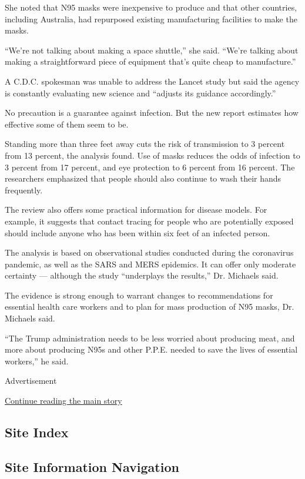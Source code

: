 She noted that N95 masks were inexpensive to produce and that other
countries, including Australia, had repurposed existing manufacturing
facilities to make the masks.

``We're not talking about making a space shuttle,'' she said. ``We're
talking about making a straightforward piece of equipment that's quite
cheap to manufacture.''

A C.D.C. spokesman was unable to address the Lancet study but said the
agency is constantly evaluating new science and ``adjusts its guidance
accordingly.''

No precaution is a guarantee against infection. But the new report
estimates how effective some of them seem to be.

Standing more than three feet away cuts the risk of transmission to 3
percent from 13 percent, the analysis found. Use of masks reduces the
odds of infection to 3 percent from 17 percent, and eye protection to 6
percent from 16 percent. The researchers emphasized that people should
also continue to wash their hands frequently.

The review also offers some practical information for disease models.
For example, it suggests that contact tracing for people who are
potentially exposed should include anyone who has been within six feet
of an infected person.

The analysis is based on observational studies conducted during the
coronavirus pandemic, as well as the SARS and MERS epidemics. It can
offer only moderate certainty --- although the study ``underplays the
results,'' Dr. Michaels said.

The evidence is strong enough to warrant changes to recommendations for
essential health care workers and to plan for mass production of N95
masks, Dr. Michaels said.

``The Trump administration needs to be less worried about producing
meat, and more about producing N95s and other P.P.E. needed to save the
lives of essential workers,'' he said.

Advertisement

\protect\hyperlink{after-bottom}{Continue reading the main story}

\hypertarget{site-index}{%
\subsection{Site Index}\label{site-index}}

\hypertarget{site-information-navigation}{%
\subsection{Site Information
Navigation}\label{site-information-navigation}}

